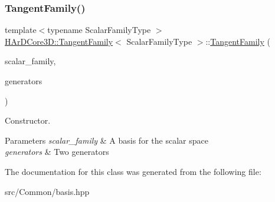 \subsubsection{\texorpdfstring{Tangent\+Family()}{TangentFamily()}}
{\footnotesize\ttfamily template$<$typename Scalar\+Family\+Type $>$ \\
\hyperlink{classHArDCore3D_1_1TangentFamily}{H\+Ar\+D\+Core3\+D\+::\+Tangent\+Family}$<$ Scalar\+Family\+Type $>$\+::\hyperlink{classHArDCore3D_1_1TangentFamily}{Tangent\+Family} (\begin{DoxyParamCaption}\item[{const Scalar\+Family\+Type \&}]{scalar\+\_\+family,  }\item[{const Eigen\+::\+Matrix$<$ double, 2, dimspace $>$ \&}]{generators }\end{DoxyParamCaption})\hspace{0.3cm}{\ttfamily [inline]}}



Constructor. 


\begin{DoxyParams}{Parameters}
{\em scalar\+\_\+family} & A basis for the scalar space \\
\hline
{\em generators} & Two generators \\
\hline
\end{DoxyParams}


The documentation for this class was generated from the following file\+:\begin{DoxyCompactItemize}
\item 
src/\+Common/basis.\+hpp\end{DoxyCompactItemize}
